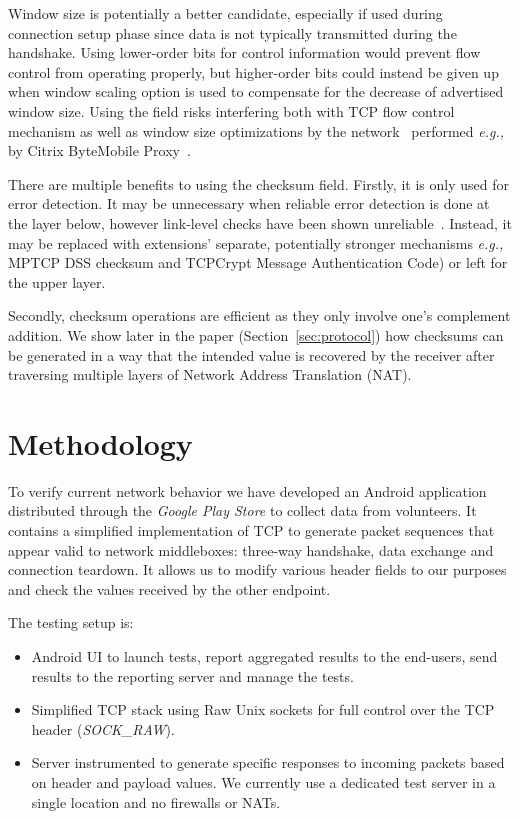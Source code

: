 \documentclass{sig-alternate-10pt}
\providecommand{\eg}{\emph{e.g.,} }
\begin{document}
Window size is potentially a better candidate, especially if used during connection setup phase since data is not typically transmitted during the handshake. Using lower-order bits for control information would prevent flow control from operating properly, but higher-order bits could instead be given up when window scaling option is used to compensate for the decrease of advertised window size. Using the field risks interfering both with TCP flow control mechanism as well as window size optimizations by the network~\cite{Kopparty:2002ht,Chakravorty:2003dm} performed \eg by Citrix ByteMobile Proxy~\cite{Ha:2006td}. 

There are multiple benefits to using the checksum field. Firstly, it is only used for error detection. It may be unnecessary when reliable error detection is done at the layer below, however link-level checks have been shown unreliable~\cite{Stone:2000fc}. Instead, it may be replaced with extensions' separate, potentially stronger mechanisms \eg MPTCP DSS checksum and TCPCrypt Message Authentication Code) or left for the upper layer.

Secondly, checksum operations are efficient as they only involve one's complement addition. We show later in the paper (Section~\ref{sec:protocol}) how checksums can be generated in a way that the intended value is recovered by the receiver after traversing multiple layers of Network Address Translation (NAT).

\section{Methodology}

To verify current network behavior we have developed an Android application distributed through the \emph{Google Play Store} to collect data from volunteers. It contains a simplified implementation of TCP to generate packet sequences that appear valid to network middleboxes: three-way handshake, data exchange and connection teardown. It allows us to modify various header fields to our purposes and check the values received by the other endpoint.

The testing setup is:
\begin{itemize}
    \item Android UI to launch tests, report aggregated results to the end-users, send results to the reporting server and manage the tests.
    \item Simplified TCP stack using Raw Unix sockets for full control over the TCP header (\emph{SOCK\_RAW}). %
    \item Server instrumented to generate specific responses to incoming packets based on header and payload values. We currently use a dedicated test server in a single location and no firewalls or NATs.
\end{itemize}
\end{document}

